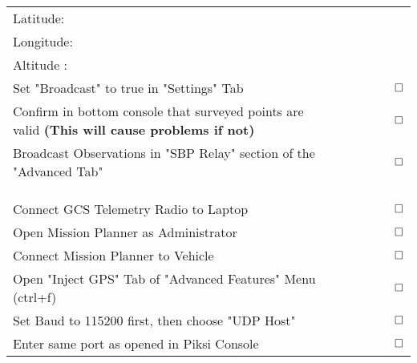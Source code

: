 \documentclass[12pt]{article}
\begin{document}
\begin{longtable}{|>{\raggedright}m{3cm}| m{2cm}| m{2cm}| m{2cm}|m{2cm}|c}
		Latitude:                                                                                   & \multicolumn{3}{c}{ } & & ~  \\   \cline{1-5}
		Longitude:                                                                                  & \multicolumn{3}{c}{ } & & ~  \\   \cline{1-5}
		Altitude :                                                                                  & \multicolumn{3}{c}{ } & & ~  \\   \cline{1-5}
		Set "Broadcast" to true in "Settings" Tab                                                  & \multicolumn{4}{c}{ }  & $\huge \square$ \\   \cline{1-1}
		Confirm in bottom console that surveyed points are valid \textbf{(This will cause problems if not)} & \multicolumn{4}{c}{ }  & $\huge \square$ \\   \cline{1-1}
		Broadcast Observations in "SBP Relay" section of the "Advanced Tab"                        & \multicolumn{4}{c}{ }  & $\huge \square$ \\   \cline{1-1}
		\multicolumn{6}{c}{ }\\
		\multicolumn{6}{l}{\large\textbf{Mission Planner}}                                                                                  \\  \hline
		\multicolumn{6}{c}{ }\\ \cline{1-1}
		Connect GCS Telemetry Radio to Laptop                                                      & \multicolumn{4}{c}{ }  & $\huge \square$ \\   \cline{1-1}
		Open Mission Planner as Administrator                                                      & \multicolumn{4}{c}{ }  & $\huge \square$ \\   \cline{1-1}
		Connect Mission Planner to Vehicle                                                         & \multicolumn{4}{c}{ }  & $\huge \square$ \\   \cline{1-1}
		Open "Inject GPS" Tab of "Advanced Features" Menu (ctrl+f)                                 & \multicolumn{4}{c}{ }  & $\huge \square$ \\   \cline{1-1}
		Set Baud to 115200 first, then choose "UDP Host"                                           & \multicolumn{4}{c}{ }  & $\huge \square$ \\   \cline{1-1}
		\newpage\cline{1-1}
		Enter same port as opened in Piksi Console                                                 & \multicolumn{4}{c}{ }  & $\huge \square$ \\   \cline{1-1}

\end{longtable}
\end{document}

